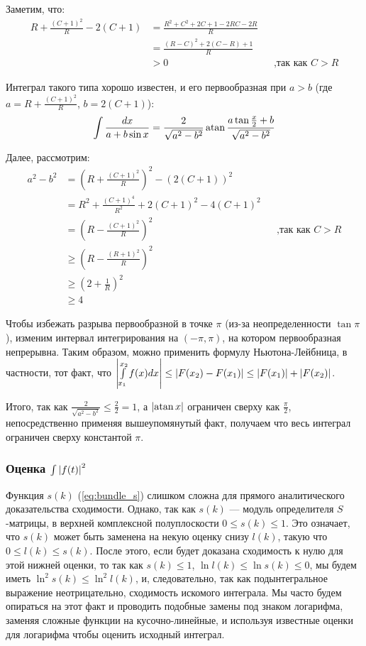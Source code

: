 Заметим, что:
\begin{align*}
   R + \frac{(C + 1)^2}{R} - 2 (C + 1)
   &= \frac{R^2 + C^2 + 2C + 1 - 2 RC - 2 R}{R}
\\ &= \frac{(R - C)^2 + 2(C - R) + 1}{R}
\\ &> 0 && \text{,так как $C > R$} 
\end{align*}

Интеграл такого типа хорошо известен, и его первообразная при $a > b$ (где $a = R + \frac{(C + 1)^2}{R}$, $b = 2 (C + 1)$):
\[
\int \frac{dx}{a + b \sin x} = \frac{2}{\sqrt{a^2 - b^2}} \atan \frac{a \tan \frac{x}{2} + b}{\sqrt{a^2 - b^2}}
\]

Далее, рассмотрим:
\begin{align*}
a^2 - b^2
& =  (R + \frac{(C + 1)^2}{R})^2 - (2 (C + 1))^2\\
& =  R^2 + \frac{(C+1)^4}{R^2} + 2 (C+1)^2 - 4 (C + 1)^2 \\
& =  (R - \frac{(C + 1)^2}{R})^2 && \text{,так как $C > R$} \\
&\ge (R - \frac{(R + 1)^2}{R})^2 \\
&\ge (2 + \frac{1}{R})^2 \\
&\ge 4
\end{align*}

Чтобы избежать разрыва первообразной в точке $\pi$ (из-за неопределенности $\tan \pi$), изменим интервал интегрирования на $(-\pi, \pi)$, на котором первообразная непрерывна. Таким образом, можно применить формулу Ньютона-Лейбница, в частности, тот факт, что $\abs{\int\limits_{x_1}^{x_2} f(x) dx} \le \abs{F(x_2) - F(x_1)} \le \abs{F(x_1)} + \abs{F(x_2)}$.

Итого, так как $\frac{2}{\sqrt{a^2 - b^2}} \le \frac{2}{2} = 1$, а $\abs{\atan x}$ ограничен сверху как $\frac{\pi}{2}$, непосредственно применяя вышеупомянутый факт, получаем что весь интеграл ограничен сверху константой $\pi$.


\subsubsection{Оценка $\int \abs{f(t)}^2$}
Функция $s(k)$ (\ref{eq:bundle_s}) слишком сложна для прямого аналитического доказательства сходимости. Однако, так как $s(k)$ — модуль определителя $S$-матрицы, в верхней комплексной полуплоскости $0 \le s(k) \le 1$. Это означает, что $s(k)$ может быть заменена на некую оценку снизу $l(k)$, такую что $0 \le l(k) \le s(k)$. После этого, если будет доказана сходимость к нулю для этой нижней оценки, то так как $s(k) \le 1$, $\ln l(k) \le \ln s(k) \le 0$, мы будем иметь $\ln^2 s(k) \le \ln^2 l(k)$, и, следовательно, так как подынтегральное выражение неотрицательно, сходимость искомого интеграла. Мы часто будем опираться на этот факт и проводить подобные замены под знаком логарифма, заменяя сложные функции на кусочно-линейные, и используя известные оценки для логарифма чтобы оценить исходный интеграл.


